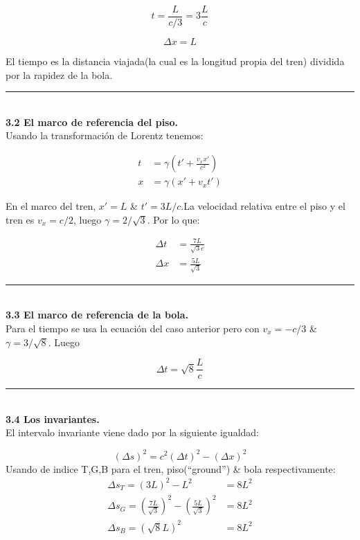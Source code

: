 \documentclass[12pt]{article}
\begin{document}
\begin{equation}
t = \frac{L}{c/3} = 3 \frac{L}{c}
\end{equation}

\begin{equation}
\Delta x = L 
\end{equation}

El tiempo es la distancia viajada(la cual es la longitud propia del tren) dividida por la rapidez de la bola.\\
\noindent\rule{16.5cm}{0.4pt}\\
\textbf{3.2 El marco de referencia del piso.}\\

 Usando la transformación de Lorentz tenemos:
 
 \begin{align*}
 t &= \gamma \left( t'+ \frac{v_x x'}{c^2}\right)\\
 x &= \gamma (x'+v_x t')
 \end{align*}
 
 En el marco del tren, $x' = L$ \& $t'  = 3L/c$.La velocidad relativa entre el piso y el tren es $v_x = c/2$, luego $\gamma = 2/ \sqrt{3}$.
 Por lo que:
 
 
  \begin{align*}
 \Delta t &= \frac{7L}{\sqrt{3} c}\\
 \Delta x &= \frac{5L}{\sqrt{3} }
 \end{align*}
\noindent\rule{16.5cm}{0.4pt}\\
\textbf{3.3 El marco de referencia de la bola.}\\


 Para el tiempo se usa la ecuación del caso anterior pero con $v_x = -c/3$ \& $\gamma = 3/ \sqrt{8}$. Luego
 
 
\begin{equation}
\Delta t = \sqrt{8} \frac{L}{c}
\end{equation}
\noindent\rule{16.5cm}{0.4pt}\\
\textbf{3.4 Los invariantes.}\\

 El intervalo invariante viene dado por la siguiente igualdad:

\begin{equation}
(\Delta s)^2 = c^2(\Delta t)^2 - (\Delta x)^2
\end{equation}
Usando de indice T,G,B para el tren, piso(“ground”) \& bola respectivamente:
\begin{align}
\Delta s_T = (3L)^2 - L^2& = 8 L^2\\
\Delta s_G= \left(\frac{7 L}{\sqrt{3}}\right)^2 - \left(\frac{5 L}{\sqrt{3}}\right)^2& = 8 L^2\\
\Delta s_B = (\sqrt{8}L)^2& = 8 L^2\\
\end{align}
\end{document}
